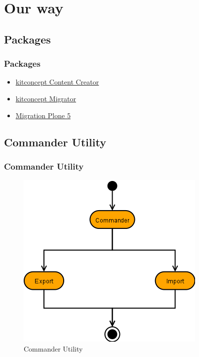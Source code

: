 \documentclass[aspectratio=169]{beamer}
\begin{document}
\section{Our way}
\subsection{Packages}
\begin{frame}
  \frametitle{Packages}
  \begin{itemize}
    \item \href{https://github.com/kitconcept/kitconcept.contentcreator}{kitconcept Content Creator} \pause
    \item \href{https://github.com/kitconcept/migration-plone5/tree/master/src/kitconcept.migrator}{kitconcept Migrator} \pause
    \item \href{https://github.com/kitconcept/migration-plone5}{Migration Plone 5}
  \end{itemize}
\end{frame}

\subsection{Commander Utility}
\begin{frame}
  \frametitle{Commander Utility}
  \begin{figure}
    \includegraphics[height=.7\textheight]{./img/006_-_Commander_Utility.png}
    \caption{Commander Utility}
  \end{figure}
\end{frame}
\end{document}
